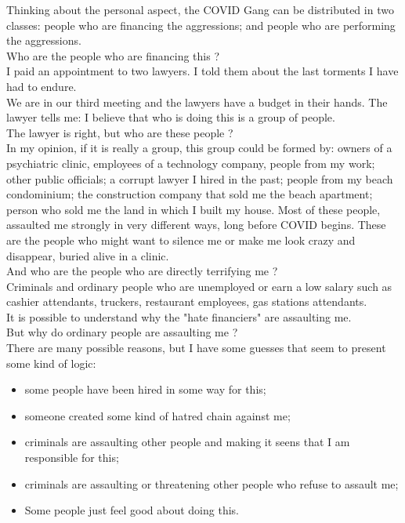\documentclass[11pt]{book}
\begin{document}
\noindent Thinking about the personal aspect, the COVID Gang can be distributed in two classes: people who are financing the aggressions; and people who are performing the aggressions. \\

\noindent Who are the people who are financing this ? \\

\noindent I paid an appointment to two lawyers. I told them about the last torments I have had to endure. \\

\noindent We are in our third meeting and the lawyers have a budget in their hands. The lawyer tells me: I believe that who is doing this is a group of people. \\

\noindent The lawyer is right, but who are these people ? \\

\noindent In my opinion, if it is really a group, this group could be formed by: owners of a psychiatric clinic, employees of a technology company, people from my work; other public officials; a corrupt lawyer I hired in the past; people from my beach condominium; the construction company that sold me the beach apartment; person who sold me the land in which I built my house. Most of these people, assaulted me strongly in very different ways, long before COVID begins. These are the people who might want to silence me or make me look crazy and disappear, buried alive in a clinic.\\

\noindent And who are the people who are directly terrifying me ? \\

\noindent Criminals and ordinary people who are unemployed or earn a low salary such as cashier attendants, truckers, restaurant employees, gas stations attendants. \\

\noindent It is possible to understand why the "hate financiers" are assaulting me. \\

\noindent But why do ordinary people are assaulting me ? \\

\noindent There are many possible reasons, but I have some guesses that seem to present some kind of logic:

\begin {itemize}
\item some people have been hired in some way for this;
\item someone created some kind of hatred chain against me;
\item criminals are assaulting other people and making it seens that I am responsible for this;
\item criminals are assaulting or threatening other people who refuse to assault me;
\item Some people just feel good about doing this.
\end{itemize}
\end{document}
